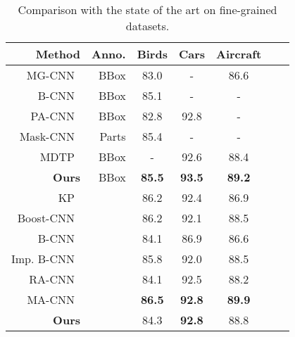 \documentclass{bmvc2k}
\begin{document}
\begin{table}
\begin{minipage}{0.6\textwidth}
	\begin{tabular}{|r|r|c|c|c|c|c|}
		\hline
		Method                            &   Anno. &  Birds & Cars & Aircraft \\
		\hline
		MG-CNN~\cite{MG_CNN2015}         &  BBox      & 83.0 & - & 86.6 \\
		B-CNN~\cite{bcnn}                &  BBox   & 85.1 & - & - \\
		PA-CNN~\cite{PACNN2015}          &  BBox   & 82.8 & 92.8 & - \\
		Mask-CNN~\cite{maskcnn}          &  Parts & 85.4 & - & - \\
		MDTP~\cite{MDTP}             &  BBox & - & 92.6 & 88.4 \\
		\textbf{Ours}                        & BBox  & \textbf{85.5} & \textbf{93.5} & \textbf{89.2}   \\      
		\hline
		KP~\cite{KP2017}                     &             & 86.2 & 92.4 & 86.9 \\
		Boost-CNN~\cite{boostedCNN}  	     &  & 86.2 & 92.1 & 88.5 \\
		B-CNN~\cite{bcnn}  	                 &  & 84.1 & 86.9    & 86.6    \\
		Imp. B-CNN~\cite{improvedbcnn}   &  & 85.8 & 92.0 & 88.5 \\
		RA-CNN~\cite{RACNN2017}  	         &  & 84.1 & 92.5 & 88.2 \\
		MA-CNN~\cite{MACNN2017}	             &  & \textbf{86.5} & \textbf{92.8} &  \textbf{89.9} \\
		\textbf{Ours}                        &  & 84.3 & \textbf{92.8} & 88.8\\      
		\hline
	\end{tabular}
	\vspace{0.1in}
	\caption{\label{table:comp_finegrained}Comparison with the state of the art on fine-grained datasets.}
\end{minipage}

\end{table}
\end{document}
